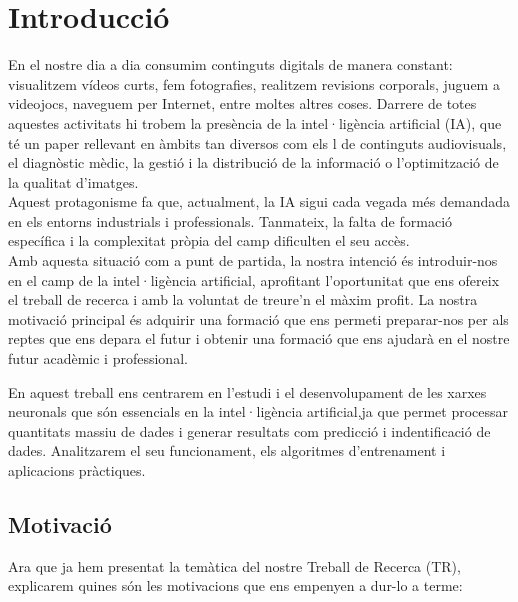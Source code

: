 \chapter{Introducció}
\label{c:intro}
En el nostre dia a dia consumim continguts digitals de manera constant: visualitzem vídeos curts, fem fotografies, realitzem revisions corporals, juguem a videojocs, naveguem per Internet, entre moltes altres coses. Darrere de totes aquestes activitats hi trobem la presència de la intel·ligència artificial (IA), que té un paper rellevant en àmbits tan diversos com els l de continguts audiovisuals, el diagnòstic mèdic, la gestió i la distribució de la informació o l’optimització de la qualitat d’imatges.\\

Aquest protagonisme fa que, actualment, la IA sigui cada vegada més demandada en els entorns industrials i professionals. Tanmateix, la falta de formació específica i la complexitat pròpia del camp dificulten el seu accès.\\

Amb aquesta situació com a punt de partida, la nostra intenció és introduir-nos en el camp de la intel·ligència artificial, aprofitant l’oportunitat que ens ofereix el treball de recerca i amb la voluntat de treure’n el màxim profit. La nostra motivació principal és adquirir una formació que ens permeti preparar-nos per als reptes que ens depara el futur i obtenir una formació que ens ajudarà en el nostre futur acadèmic i professional.

En aquest treball ens centrarem en l'estudi i el desenvolupament de les xarxes neuronals que són essencials en la intel·ligència artificial,ja que permet processar quantitats massiu de dades i generar resultats com predicció i indentificació de dades. Analitzarem el seu funcionament, els algoritmes d'entrenament i aplicacions pràctiques.




\section{Motivació}
Ara que ja hem presentat la temàtica del nostre Treball de Recerca (TR), explicarem quines són les motivacions que ens empenyen a dur-lo a terme:

